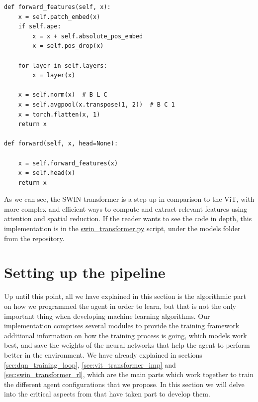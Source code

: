 \begin{lstlisting}[caption={Forward method for the SWIN Transformer}, label={code:forward_swin}]
def forward_features(self, x):
	x = self.patch_embed(x)
	if self.ape:
		x = x + self.absolute_pos_embed
		x = self.pos_drop(x)
	
	for layer in self.layers:
		x = layer(x)
	
	x = self.norm(x)  # B L C
	x = self.avgpool(x.transpose(1, 2))  # B C 1
	x = torch.flatten(x, 1)
	return x
	
def forward(self, x, head=None):

	x = self.forward_features(x)
	x = self.head(x)
	return x
\end{lstlisting}

As we can see, the SWIN transformer is a step-up in comparison to the ViT, with more complex and efficient ways to compute and extract relevant features using attention and spatial reduction. If the reader wants to see the code in depth, this implementation is in the \href{https://github.com/Javimh18/DL_TFM/blob/main/src/models/swin_transformer.py}{swin\_transformer.py} script, under the models folder from the repository.

\section{Setting up the pipeline}
\label{sec:set_pipeline}

Up until this point, all we have explained in this section is the algorithmic part on how we programmed the agent in order to learn, but that is not the only important thing when developing machine learning algorithms. Our implementation comprises several modules to provide the training framework additional information on how the training process is going, which models work best, and save the weights of the neural networks that help the agent to perform better in the environment. We have already explained in sections \ref{sec:dqn_training_loop}, \ref{sec:vit_transformer_imp} and \ref{sec:swin_transformer_rl}, which are the main parts which work together to train the different agent configurations that we propose. In this section we will delve into the critical aspects from that have taken part to develop them. 

